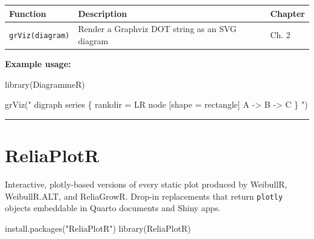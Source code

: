 \documentclass[
  letterpaper,
  DIV=11,
  numbers=noendperiod]{scrreprt}
\newenvironment{Shaded}{\begin{snugshade}}{\end{snugshade}}
\newcommand{\FunctionTok}[1]{\textcolor[rgb]{0.28,0.35,0.67}{#1}}
\newcommand{\NormalTok}[1]{\textcolor[rgb]{0.00,0.23,0.31}{#1}}
\newcommand{\StringTok}[1]{\textcolor[rgb]{0.13,0.47,0.30}{#1}}
\newcounter{none} %
\begin{document}
{\def\LTcaptype{none} %
\begin{longtable}[]{@{}
  >{\raggedright\arraybackslash}p{}
  >{\raggedright\arraybackslash}p{}
  >{\raggedright\arraybackslash}p{}@{}}
\toprule\noalign{}
\begin{minipage}[b]{\linewidth}\raggedright
Function
\end{minipage} & \begin{minipage}[b]{\linewidth}\raggedright
Description
\end{minipage} & \begin{minipage}[b]{\linewidth}\raggedright
Chapter
\end{minipage} \\
\midrule\noalign{}
\endhead
\bottomrule\noalign{}
\endlastfoot
\texttt{grViz(diagram)} & Render a Graphviz DOT string as an SVG diagram
& Ch. 2 \\
\end{longtable}
}

\textbf{Example usage:}

\begin{Shaded}
\begin{Highlighting}[]
\FunctionTok{library}\NormalTok{(DiagrammeR)}

\FunctionTok{grViz}\NormalTok{(}\StringTok{"}
\StringTok{  digraph series \{}
\StringTok{    rankdir = LR}
\StringTok{    node [shape = rectangle]}
\StringTok{    A {-}\textgreater{} B {-}\textgreater{} C}
\StringTok{  \}}
\StringTok{"}\NormalTok{)}
\end{Highlighting}
\end{Shaded}

\begin{center}\rule{0.5\linewidth}{0.5pt}\end{center}

\section*{ReliaPlotR}\label{reliaplotr}


Interactive, plotly-based versions of every static plot produced by
WeibullR, WeibullR.ALT, and ReliaGrowR. Drop-in replacements that return
\texttt{plotly} objects embeddable in Quarto documents and Shiny apps.

\begin{Shaded}
\begin{Highlighting}[]
\FunctionTok{install.packages}\NormalTok{(}\StringTok{"ReliaPlotR"}\NormalTok{)}
\FunctionTok{library}\NormalTok{(ReliaPlotR)}
\end{Highlighting}
\end{Shaded}
\end{document}
